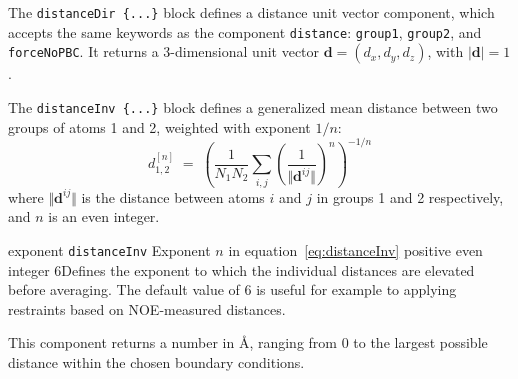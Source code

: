 
The \texttt{distanceDir~\{...\}} block defines
a distance unit vector component, which accepts the same keywords as
the component \texttt{distance}: \texttt{group1}, \texttt{group2}, and
\texttt{forceNoPBC}.  It returns a
3-dimensional unit vector $\mathbf{d} = (d_{x}, d_{y}, d_{z})$, with
$|\mathbf{d}| = 1$.

\begin{cvcoptions}
\item %
\item %
\item %
\item %
\end{cvcoptions}



The \texttt{distanceInv~\{...\}} block defines a generalized mean distance between two groups of atoms 1 and 2, weighted with exponent $1/n$:
\begin{equation}
  \label{eq:distanceInv}
  d_{\mathrm{1,2}}^{[n]} \; = \;   \left(\frac{1}{N_{\mathrm{1}}N_{\mathrm{2}}}\sum_{i,j} \left(\frac{1}{\Vert\mathbf{d}^{ij}\Vert}\right)^{n} \right)^{-1/n}
\end{equation}
where $\Vert\mathbf{d}^{ij}\Vert$ is the distance between atoms $i$ and $j$ in groups 1 and 2 respectively, and $n$ is an even integer.

\begin{cvcoptions}
\item %
\item %
\item %
\item %
  \keydef
    {exponent}{%
    \texttt{distanceInv}}{%
    Exponent $n$ in equation~\ref{eq:distanceInv}}{%
    positive even integer}{%
    6}{Defines the exponent to which the individual distances are elevated before averaging.  The default value of 6 is useful for example to applying restraints based on NOE-measured distances.}
\end{cvcoptions}
This component returns a number in \AA{}, ranging from $0$ to the largest possible distance within the chosen boundary conditions.


